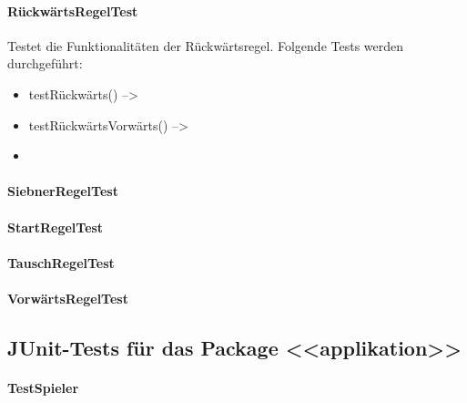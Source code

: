 \documentclass[12pt,halfparskip]{scrartcl}
\begin{document}
		\paragraph{RückwärtsRegelTest}\label{ssub:rückwärtsregeltest} %
		Testet die Funktionalitäten der Rückwärtsregel. Folgende Tests werden durchgeführt:
		\begin{itemize}
			\item testRückwärts() --> 
			\item testRückwärtsVorwärts() --> 
			\item 
		\end{itemize}
		\paragraph{SiebnerRegelTest}\label{ssub:siebnerregeltest} %
		
		\paragraph{StartRegelTest}\label{ssub:startregeltest} %
		
		\paragraph{TauschRegelTest}\label{ssub:tauschregeltest} %
		
		\paragraph{VorwärtsRegelTest}\label{ssub:vorwärtsregeltest} %
		
\subsection{JUnit-Tests für das Package <<applikation>>}\label{sub:junit_tests_für_das_package_applikation_} %
	\paragraph{TestSpieler}\label{ssub:testspieler} %
	
\end{document}
